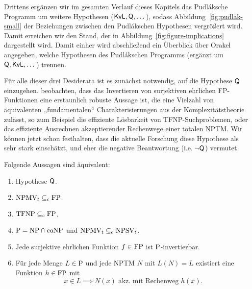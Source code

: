
Drittens ergänzen wir im gesamten Verlauf dieses Kapitels das Pudláksche Programm um weitere Hypothesen ($\mathsf{KvL}, \hQ, \dots$), sodass Abbildung~\ref{fig:pudlak-small} der Beziehungen zwischen den Pudlákschen Hypothesen vergrößert wird. Damit erreichen wir den Stand, der in Abbildung~\ref{fig:figure-implications} dargestellt wird.
Damit einher wird abschließend ein Überblick über Orakel angegeben, welche Hypothesen des Pudlákschen Programms (ergänzt um $\hQ, \mathsf{KvL}, \dots$) trennen.


Für alle dieser drei Desiderata ist es zunächst notwendig, auf die Hypothese $\hQ$ einzugehen.
\textcite{fenner_inverting_2003} beobachten, dass das Invertieren von surjektiven ehrlichen FP-Funktionen eine erstaunlich robuste Aussage ist, die eine Vielzahl von äquivalenten „fundamentalen“ \parencite{fenner_inverting_2003} Charakterisierungen aus der Komplexitätstheorie zulässt, so zum Beispiel die effiziente Lösbarkeit von TFNP-Suchproblemen, oder das effiziente Ausrechnen akzeptierender Rechenwege einer totalen NPTM. Wir können jetzt schon festhalten, dass die aktuelle Forschung diese Hypothese als sehr stark einschätzt, und eher die negative Beantwortung (i.e. $\neg\hQ$) vermutet.


\begin{theorem}\label{thm:q-orig}
    Folgende Aussagen sind äquivalent:
    \begin{enumerate}
        \item Hypothese $\hQ$.
        \item $\mathrm{NPMV}_t\subseteqc \mathrm{FP}$.
        \item $\TFNP\subseteqc \mathrm{FP}$.
        \item $\P=\NP\cap\coNP$ und $\mathrm{NPMV}_t\subseteqc \mathrm{NPSV}_t$.
        \item Jede surjektive ehrlichen Funktion $f\in\FP$ ist $\P$-invertierbar.
        \item Für jede Menge $L\in \P$  und jede NPTM $N$ mit $L(N)=L$ existiert eine Funktion $h\in \FP$ mit 
            \[ x\in L \implies N(x) \text{ akz. mit Rechenweg $h(x)$}. \]
    \end{enumerate}
\end{theorem}


